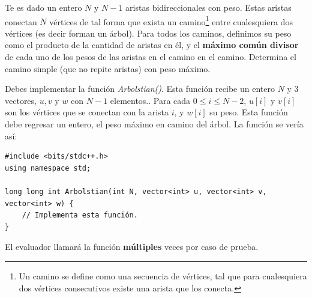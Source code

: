 \documentclass[12pt]{scrartcl}
\begin{document}
    
    
    \vspace{10pt}

    
    
        Te es dado un entero $N$ y $N - 1$ aristas bidireccionales con peso. Estas aristas conectan $N$ vértices de tal forma que exista un camino\footnote{Un camino se define como una secuencia de vértices, tal que para cualesquiera dos vértices consecutivos existe una arista que los conecta.} entre cualesquiera dos vértices (es decir forman un árbol). Para todos los caminos, definimos su peso como el producto de la cantidad de aristas en él, y el {\bfseries máximo común divisor} de cada uno de los pesos de las aristas en el camino en el camino. Determina el camino simple (que no repite aristas) con peso máximo.
    

        Debes implementar la función \textit{Arbolstian()}. Esta función recibe un entero $N$ y 3 vectores, $u, v$ y $w$  con $N - 1$ elementos.. Para cada $0 \le i \le N - 2$, $u[i]$ y $v[i]$ son los vértices que se conectan con la arista $i$, y $w[i]$ su peso. Esta función debe regresar un entero, el peso máximo en camino del árbol.
        La función se vería así:

\begin{verbatim}
#include <bits/stdc++.h>
using namespace std;

long long int Arbolstian(int N, vector<int> u, vector<int> v, vector<int> w) {
    // Implementa esta función.
}
\end{verbatim}

    El evaluador llamará la función \textbf{múltiples} veces por caso de prueba.

    
\end{document}
